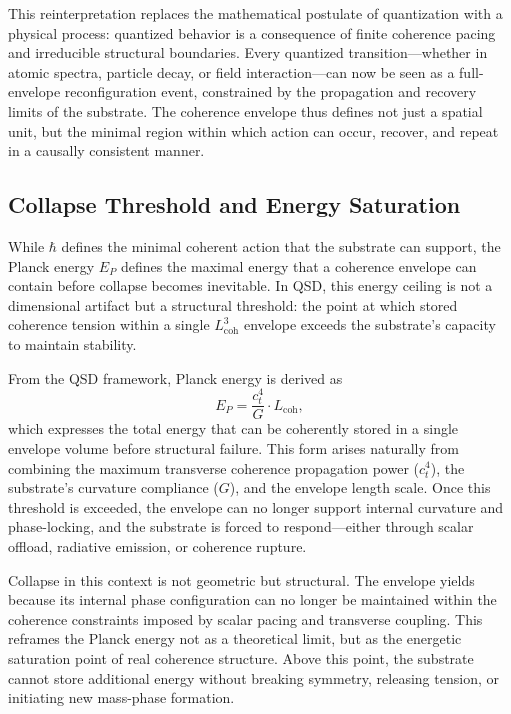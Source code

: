 \documentclass[entropy,article,submit,pdftex,moreauthors]{Definitions/mdpi}
\begin{document}
This reinterpretation replaces the mathematical postulate of quantization with a physical process: quantized behavior is a consequence of finite coherence pacing and irreducible structural boundaries. Every quantized transition—whether in atomic spectra, particle decay, or field interaction—can now be seen as a full-envelope reconfiguration event, constrained by the propagation and recovery limits of the substrate. The coherence envelope thus defines not just a spatial unit, but the minimal region within which action can occur, recover, and repeat in a causally consistent manner.
\subsection{Collapse Threshold and Energy Saturation}

While \texorpdfstring{\( \hbar \)}{hbar} defines the minimal coherent action that the substrate can support, the Planck energy \texorpdfstring{\( E_P \)}{Ep} defines the maximal energy that a coherence envelope can contain before collapse becomes inevitable. In QSD, this energy ceiling is not a dimensional artifact but a structural threshold: the point at which stored coherence tension within a single \texorpdfstring{\( L_{\text{coh}}^3 \)}{Lcoh\^{}3} envelope exceeds the substrate’s capacity to maintain stability.

From the QSD framework, Planck energy is derived as
\[
E_P = \frac{c_t^4}{G} \cdot L_{\text{coh}},
\]
which expresses the total energy that can be coherently stored in a single envelope volume before structural failure. This form arises naturally from combining the maximum transverse coherence propagation power (\texorpdfstring{\( c_t^4 \)}{ct\^{}4}), the substrate’s curvature compliance (\texorpdfstring{\( G \)}{G}), and the envelope length scale. Once this threshold is exceeded, the envelope can no longer support internal curvature and phase-locking, and the substrate is forced to respond—either through scalar offload, radiative emission, or coherence rupture.

Collapse in this context is not geometric but structural. The envelope yields because its internal phase configuration can no longer be maintained within the coherence constraints imposed by scalar pacing and transverse coupling. This reframes the Planck energy not as a theoretical limit, but as the energetic saturation point of real coherence structure. Above this point, the substrate cannot store additional energy without breaking symmetry, releasing tension, or initiating new mass-phase formation.
\end{document}

